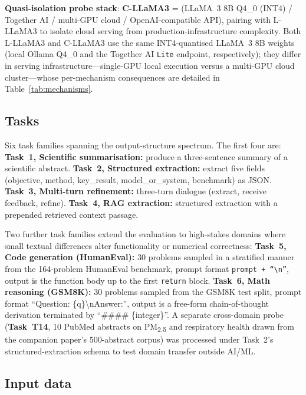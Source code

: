 \documentclass[sn-nature]{sn-jnl}
\begin{document}
\textbf{Quasi-isolation probe stack}:
\textbf{C-LLaMA3} = (LLaMA~3 8B Q4\_0 (INT4)\cite{grattafiori2024llama3} / Together AI / multi-GPU cloud / OpenAI-compatible API), pairing with L-LLaMA3 to isolate cloud serving from production-infrastructure complexity. Both L-LLaMA3 and C-LLaMA3 use the same INT4-quantised LLaMA~3 8B weights (local Ollama Q4\_0 and the Together AI \texttt{Lite} endpoint, respectively); they differ in serving infrastructure---single-GPU local execution versus a multi-GPU cloud cluster---whose per-mechanism consequences are detailed in Table~\ref{tab:mechanisms}.


\subsection{Tasks}\label{subsec:tasks}

Six task families spanning the output-structure spectrum.
The first four are:
\textbf{Task~1, Scientific summarisation:} produce a three-sentence summary of a scientific abstract.
\textbf{Task~2, Structured extraction:} extract five fields (objective, method, key\_result, model\_or\_system, benchmark) as JSON.
\textbf{Task~3, Multi-turn refinement:} three-turn dialogue (extract, receive feedback, refine).
\textbf{Task~4, RAG extraction:} structured extraction with a prepended retrieved context passage.

Two further task families extend the evaluation to high-stakes domains where small textual differences alter functionality or numerical correctness:
\textbf{Task~5, Code generation (HumanEval):} 30 problems sampled in a stratified manner from the 164-problem HumanEval benchmark\cite{chen2021humaneval}, prompt format \texttt{prompt + ``\textbackslash n''}, output is the function body up to the first \texttt{return} block.
\textbf{Task~6, Math reasoning (GSM8K):} 30 problems sampled from the GSM8K test split\cite{cobbe2021gsm8k}, prompt format ``Question: \{q\}\textbackslash nAnswer:'', output is a free-form chain-of-thought derivation terminated by ``\#\#\#\# \{integer\}''.
A separate cross-domain probe (\textbf{Task~T14}, 10 PubMed abstracts on PM\textsubscript{2.5} and respiratory health drawn from the companion paper's 500-abstract corpus\cite{rover2026evidence}) was processed under Task~2's structured-extraction schema to test domain transfer outside AI/ML.


\subsection{Input data}\label{subsec:input}
\end{document}
